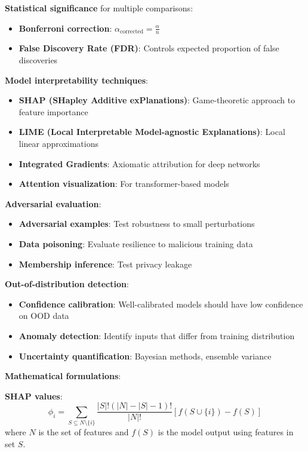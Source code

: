 \textbf{Statistical significance} for multiple comparisons:
\begin{itemize}
	\item \textbf{Bonferroni correction}: \(\alpha_{\text{corrected}} = \frac{\alpha}{n}\)
	\item \textbf{False Discovery Rate (FDR)}: Controls expected proportion of false discoveries
\end{itemize}

\textbf{Model interpretability techniques}:
\begin{itemize}
	\item \textbf{SHAP (SHapley Additive exPlanations)}: Game-theoretic approach to feature importance
	\item \textbf{LIME (Local Interpretable Model-agnostic Explanations)}: Local linear approximations
	\item \textbf{Integrated Gradients}: Axiomatic attribution for deep networks
	\item \textbf{Attention visualization}: For transformer-based models
\end{itemize}

\textbf{Adversarial evaluation}:
\begin{itemize}
	\item \textbf{Adversarial examples}: Test robustness to small perturbations
	\item \textbf{Data poisoning}: Evaluate resilience to malicious training data
	\item \textbf{Membership inference}: Test privacy leakage
\end{itemize}

\textbf{Out-of-distribution detection}:
\begin{itemize}
	\item \textbf{Confidence calibration}: Well-calibrated models should have low confidence on OOD data
	\item \textbf{Anomaly detection}: Identify inputs that differ from training distribution
	\item \textbf{Uncertainty quantification}: Bayesian methods, ensemble variance
\end{itemize}

\textbf{Mathematical formulations}:

\textbf{SHAP values}:
\[
	\phi_i = \sum_{S \subseteq N \setminus \{i\}} \frac{|S|!(|N| - |S| - 1)!}{|N|!} [f(S \cup \{i\}) - f(S)]
\]
where \(N\) is the set of features and \(f(S)\) is the model output using features in set \(S\).

